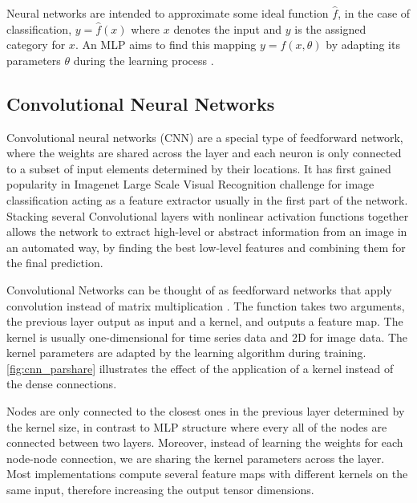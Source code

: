 Neural networks are intended to approximate some ideal function $\hat f$, in the case of classification, $y = \hat f(x)$ where $x$ denotes the input and $y$ is the assigned category for $x$. An MLP aims to find this mapping $y = f(x, \theta)$ by adapting its parameters $\theta$ during the learning process \cite{DL_book_Goodfellow}.




\subsection{Convolutional Neural Networks}

Convolutional neural networks (CNN) are a special type of feedforward network, where the weights are shared across the layer and each neuron is only connected to a subset of input elements determined by their locations. It has first gained popularity in Imagenet \cite{deng2009imagenet} Large Scale Visual Recognition challenge for image classification acting as a feature extractor usually in the first part of the network. Stacking several Convolutional layers with nonlinear activation functions together allows the network to extract high-level or abstract information from an image in an automated way, by finding the best low-level features and combining them for the final prediction.

Convolutional Networks can be thought of as feedforward networks that apply convolution instead of matrix multiplication \cite{DL_book_Goodfellow}. The function takes two arguments, the previous layer output as input and a kernel, and outputs a feature map. The kernel is usually one-dimensional for time series data and 2D for image data. The kernel parameters are adapted by the learning algorithm during training. \autoref{fig:cnn_parshare} illustrates the effect of the application of a kernel instead of the dense connections.

Nodes are only connected to the closest ones in the previous layer determined by the kernel size, in contrast to MLP structure where every all of the nodes are connected between two layers. Moreover, instead of learning the weights for each node-node connection, we are sharing the kernel parameters across the layer. Most implementations compute several feature maps with different kernels on the same input, therefore increasing the output tensor dimensions.


